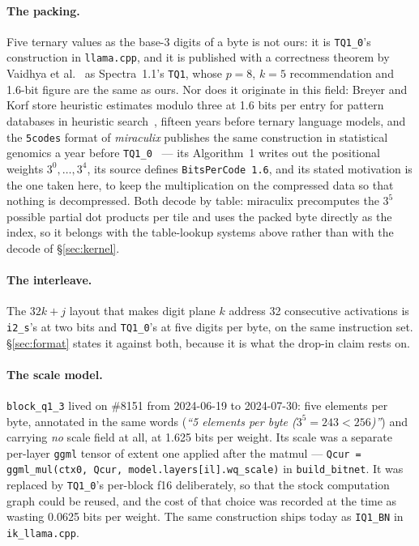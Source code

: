 \documentclass[11pt,a4paper]{article}
\newcommand{\code}[1]{\texttt{#1}}
\begin{document}
\paragraph{The packing.} Five ternary values as the base-3 digits of a byte
is not ours: it is \code{TQ1\_0}'s construction in \code{llama.cpp}, and
it is published with a correctness theorem by Vaidhya et
al.~\cite{spectra} as Spectra~1.1's \code{TQ1}, whose $p=8$, $k=5$
recommendation and \num{1.6}-bit figure are the same as ours. Nor does it
originate in this field: Breyer and Korf store heuristic estimates modulo
three at \num{1.6} bits per entry for pattern databases in heuristic
search~\cite{breyerkorf}, fifteen years before ternary language models,
and the \code{5codes} format of \emph{miraculix} publishes the same
construction in statistical genomics a year before
\code{TQ1\_0}~\cite{miraculix} --- its Algorithm~1 writes out the
positional weights $3^{0},\dots,3^{4}$, its source defines
\code{BitsPerCode 1.6}, and its stated motivation is the one taken here,
to keep the multiplication on the compressed data so that nothing is
decompressed. Both decode by table: miraculix precomputes the $3^{5}$
possible partial dot products per tile and uses the packed byte directly
as the index, so it belongs with the table-lookup systems above rather
than with the decode of \S\ref{sec:kernel}.

\paragraph{The interleave.} The $32k+j$ layout that makes digit plane $k$
address 32 consecutive activations is \code{i2\_s}'s at two bits and
\code{TQ1\_0}'s at five digits per byte, on the same instruction set.
\S\ref{sec:format} states it against both, because it is what the drop-in claim
rests on.

\paragraph{The scale model.} \code{block\_q1\_3} lived on \#8151 from 2024-06-19 to
2024-07-30: five elements per byte, annotated in the same words
(\emph{``5 elements per byte ($3^5 = 243 < 256$)''}) and carrying
\emph{no} scale field at all, at \num{1.625} bits per weight. Its scale
was a separate per-layer \code{ggml} tensor of extent one applied after
the matmul --- \code{Qcur = ggml\_mul(ctx0, Qcur,
model.layers[il].wq\_scale)} in \code{build\_bitnet}. It was replaced by
\code{TQ1\_0}'s per-block f16 deliberately, so that the stock computation
graph could be reused, and the cost of that choice was recorded at the
time as wasting \num{0.0625} bits per weight. The same construction ships
today as \code{IQ1\_BN} in \code{ik\_llama.cpp}.
\end{document}
